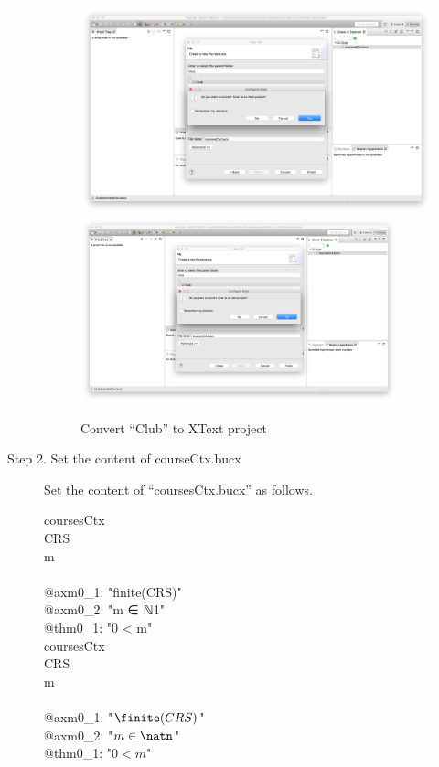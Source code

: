 \begin{description}
\begin{figure}[!htbp]
  \centering
  \ifplastex
  \includegraphics[width=512]{figures/ConvertToXText}
  \else
  \includegraphics[width=0.9\textwidth]{figures/ConvertToXText}
  \fi
  \caption{Convert ``Club'' to XText project}
  \label{fig:ConvertToXText}
\end{figure}

\item[Step 2. Set the content of courseCtx.bucx] Set the content of ``coursesCtx.bucx'' as follows.
  \begin{center}
    \begin{Bcode}
      \ifplastex
      \Bcontext{} coursesCtx\\
      \Bsets{} CRS\\
      \Bconstants{} m\\
      \Baxioms\\
      @axm0_1: "finite(CRS)"\\
      @axm0_2: "m ∈ ℕ1"\\
      @thm0_1: "0 < m" \Btheorem\\
      \Bend
      \else
\Bcontext{} coursesCtx\\
\Bsets{} CRS\\
\Bconstants{} m\\
\Baxioms\\
\Btab @axm0\_1: "\(\finite(CRS)\)"\\
\Btab @axm0\_2: "\(m \in \natn\)"\\
\Btab @thm0\_1: "\(0 < m\)" \Btheorem\\
\Bend
       \fi
    \end{Bcode}
  \end{center}


\end{description}
